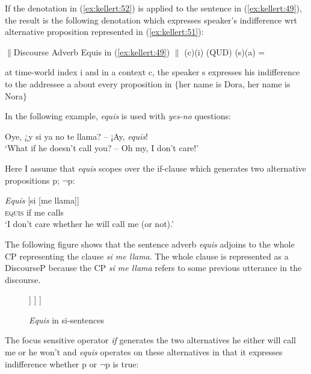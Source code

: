 \documentclass[output=paper]{langsci/langscibook}
\begin{document}
If the denotation in (\ref{ex:kellert:52}) is applied to the sentence in (\ref{ex:kellert:49}), the result is the following denotation which expresses speaker’s indifference wrt alternative proposition represented in (\ref{ex:kellert:51}):

\ea\label{ex:kellert:53} $\parallel$Discourse Adverb Equis in (\ref{ex:kellert:49}) $\parallel$ (c)(i) (QUD) (s)(a) =\par
at time-world index i and in a context c, the speaker s expresses his indifference to the addressee a about every proposition in $\lbrace$her name is Dora, her name is Nora$\rbrace$
\z

In the following example, \textit{equis} is used with \textit{yes-no} questions:

\ea\label{ex:kellert:54}
Oye, {¿}y si ya no te llama? – {¡}Ay, \textit{equis}!\\
\glt ‘What if he doesn’t call you? – Oh my, I don’t care!’
\z

Here I assume that \textit{equis} scopes over the if-clause which generates two alternative propositions {p; $¬$p}:

\ea\label{ex:kellert:55}
\gll \textit{Equis} [si [me llama]]\\
\textsc{equis} if me calls\\
\glt ‘I don’t care whether he will call me (or not).’
\z

The following figure shows that the sentence adverb \textit{equis} adjoins to the whole CP representing the clause \textit{si me llama}. The whole clause is represented as a DiscourseP because the CP \textit{si me llama} refers to some previous utterance in the discourse.


\begin{figure}
	\caption{\textit{Equis} in si-sentences\label{fig:kellert:tree3}}
	\begin{forest}
		[DiscourseP
			[\textit{Equis}] [CP
				[C\textsuperscript{0}\\\textit{si}][TP
				[\textit{me llama},roof]
		    	]
			]
		]
	\end{forest}
\end{figure}

The focus sensitive operator \textit{if} generates the two alternatives he either will call me or he won’t and \textit{equis} operates on these alternatives in that it expresses indifference whether p or $¬$p is true:
\end{document}
